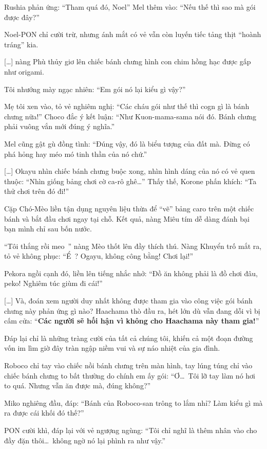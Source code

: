 \documentclass[../main.tex]{subfiles}
\begin{document}
Rushia phản ứng: ``Tham quá đó, Noel'' Mel thêm vào: ``Nếu thế thì sao mà gói được đây?''

Noel-PON chỉ cười trừ, nhưng ánh mắt có vẻ vẫn còn luyến tiếc tảng thịt ``hoành tráng'' kia.

    [\dots] nàng Phù thủy giơ lên chiếc bánh chưng hình con chim hồng hạc được gấp như origami.

Tôi nhướng mày ngạc nhiên: ``Em gói nó lại kiểu gì vậy?''

Mẹ tôi xen vào, tỏ vẻ nghiêm nghị: ``Các cháu gói như thế thì cogn gì là bánh chưng nữa!'' Choco đắc ý kết luận: ``Như Kuon-mama-sama nói đó. Bánh chưng phải vuông vắn mới đúng ý nghĩa.''

Mel cũng gật gù đồng tình: ``Đúng vậy, đó là biểu tượng của đất mà. Đừng có phá hỏng hay méo mó tinh thần của nó chứ.''

[\dots] Okayu nhìn chiếc bánh chưng buộc xong, nhìn hình dáng của nó có vẻ quen thuộc: ``Nhìn giống bảng chơi cờ ca-rô ghê\dots'' Thấy thế, Korone phấn khích: ``Ta thử chơi trên đó đi!''

Cặp Chó-Mèo liền tận dụng nguyên liệu thừa để ``vẽ'' bảng caro trên một chiếc bánh và bắt đầu chơi ngay tại chỗ. Kết quả, nàng Miêu tím dễ dàng đánh bại bạn mình chỉ sau bốn nước.

``Tôi thắng rồi meo~'' nàng Mèo thốt lên đầy thích thú. Nàng Khuyển trố mắt ra, tỏ vẻ không phục: ``Ể~? Ogayu, không công bằng! Chơi lại!''

Pekora ngồi cạnh đó, liền lên tiếng nhắc nhở: ``Đồ ăn không phải là đồ chơi đâu, peko! Nghiêm túc giùm đi cái!''

[\dots] Và, đoán xem người duy nhất không được tham gia vào công việc gói bánh chưng này phản ứng gì nào? Haachama thò đầu ra, hét lớn dù vẫn đang dỗi vì bị cấm cửa: ``\textbf{Các người sẽ hối hận vì không cho Haachama này tham gia!}''

Đáp lại chỉ là những tràng cười của tất cả chúng tôi, khiến cả một đoạn đường vốn im lìm giờ đây tràn ngập niềm vui và sự náo nhiệt của gia đình.

\il

Roboco chỉ tay vào chiếc nồi bánh chưng trên màn hình, tay lúng túng chỉ vào chiếc bánh chưng to bất thường do chính em ấy gói: ``Ơ\dots\ Tôi lỡ tay làm nó hơi to quá. Nhưng vẫn ăn được mà, đúng không?''

Miko nghiêng đầu, đáp: ``Bánh của Roboco-san trông to lắm nhỉ? Làm kiểu gì mà ra được cái khối đó thế?''

PON cười khì, đáp lại với vẻ ngượng ngùng: ``Tôi chỉ nghĩ là thêm nhân vào cho đầy đặn thôi\dots\ không ngờ nó lại phình ra như vậy.''
\end{document}
